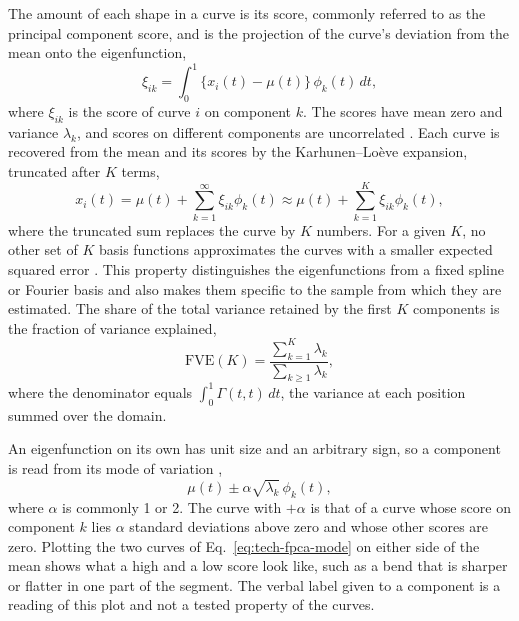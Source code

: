 The amount of each shape in a curve is its score, commonly referred to as the principal component score, and is the projection of the curve's deviation from the mean onto the eigenfunction,
\begin{equation}
  \xi_{ik} = \int_0^1 \{x_i(t) - \mu(t)\}\, \phi_k(t)\, dt ,
  \label{eq:tech-fpca-score}
\end{equation}
where $\xi_{ik}$ is the score of curve $i$ on component $k$.
The scores have mean zero and variance $\lambda_k$, and scores on different components are uncorrelated \cite{wang2016fda}.
Each curve is recovered from the mean and its scores by the Karhunen--Lo\`eve expansion, truncated after $K$ terms,
\begin{equation}
  x_i(t) = \mu(t) + \sum_{k=1}^{\infty} \xi_{ik} \phi_k(t)
  \approx \mu(t) + \sum_{k=1}^{K} \xi_{ik} \phi_k(t),
  \label{eq:tech-fpca-kl}
\end{equation}
where the truncated sum replaces the curve by $K$ numbers.
For a given $K$, no other set of $K$ basis functions approximates the curves with a smaller expected squared error \cite{wang2016fda}.
This property distinguishes the eigenfunctions from a fixed spline or Fourier basis and also makes them specific to the sample from which they are estimated.
The share of the total variance retained by the first $K$ components is the fraction of variance explained,
\begin{equation}
  \mathrm{FVE}(K) = \frac{\sum_{k=1}^{K} \lambda_k}{\sum_{k \ge 1} \lambda_k},
  \label{eq:tech-fpca-fve}
\end{equation}
where the denominator equals $\int_0^1 \Gamma(t, t)\, dt$, the variance at each position summed over the domain.

An eigenfunction on its own has unit size and an arbitrary sign, so a component is read from its mode of variation \cite{jones1992displaying, wang2016fda},
\begin{equation}
  \mu(t) \pm \alpha \sqrt{\lambda_k}\, \phi_k(t),
  \label{eq:tech-fpca-mode}
\end{equation}
where $\alpha$ is commonly 1 or 2.
The curve with $+\alpha$ is that of a curve whose score on component $k$ lies $\alpha$ standard deviations above zero and whose other scores are zero.
Plotting the two curves of Eq.~\eqref{eq:tech-fpca-mode} on either side of the mean shows what a high and a low score look like, such as a bend that is sharper or flatter in one part of the segment.
The verbal label given to a component is a reading of this plot and not a tested property of the curves.


